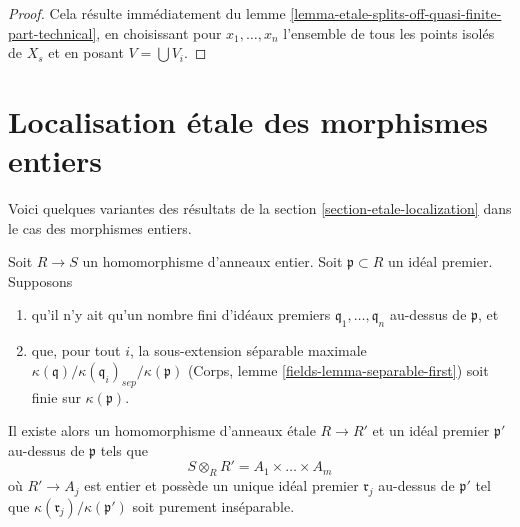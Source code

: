 \begin{proof}
Cela résulte immédiatement du
lemme \ref{lemma-etale-splits-off-quasi-finite-part-technical},
en choisissant pour $x_1, \ldots, x_n$ l'ensemble de tous les
points isolés de $X_s$ et en posant $V = \bigcup V_i$.
\end{proof}






\section{Localisation \'etale des morphismes entiers}
\label{section-etale-localization-integral}

\noindent
Voici quelques variantes des résultats de la section \ref{section-etale-localization}
dans le cas des morphismes entiers.

\begin{lemma}
\label{lemma-etale-makes-integral-split}
Soit $R \to S$ un homomorphisme d'anneaux entier. Soit $\mathfrak p \subset R$ un idéal
premier. Supposons
\begin{enumerate}
\item qu'il n'y ait qu'un nombre fini d'idéaux premiers $\mathfrak q_1, \ldots, \mathfrak q_n$
au-dessus de $\mathfrak p$, et
\item que, pour tout $i$, la sous-extension séparable maximale
$\kappa(\mathfrak q)/\kappa(\mathfrak q_i)_{sep}/\kappa(\mathfrak p)$
(Corps, lemme \ref{fields-lemma-separable-first})
soit finie sur $\kappa(\mathfrak p)$.
\end{enumerate}
Il existe alors un homomorphisme d'anneaux \'etale $R \to R'$ et un idéal premier
$\mathfrak p'$ au-dessus de $\mathfrak p$ tels que
$$
S \otimes_R R' = A_1 \times \ldots \times A_m
$$
où $R' \to A_j$ est entier et possède un unique idéal premier $\mathfrak r_j$
au-dessus de $\mathfrak p'$ tel que $\kappa(\mathfrak r_j)/\kappa(\mathfrak p')$
soit purement inséparable.
\end{lemma}

